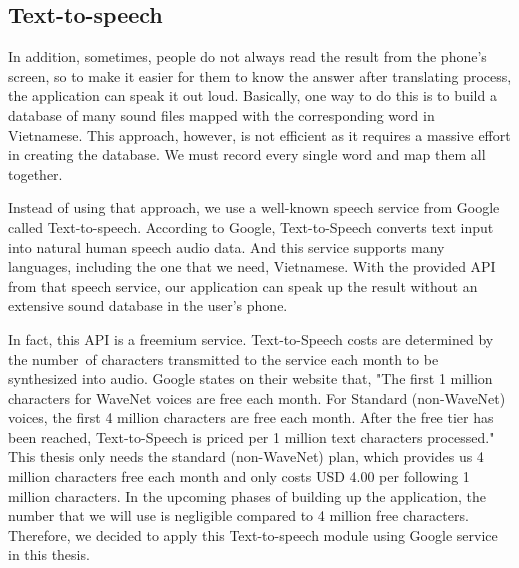 \subsection{Text-to-speech}

In addition, sometimes, people do not always read the result from the phone's screen, so to make it easier for them to know the answer after translating process, the application can speak it out loud. Basically, one way to do this is to build a database of many sound files mapped with the corresponding word in Vietnamese. This approach, however, is not efficient as it requires a massive effort in creating the database. We must record every single word and map them all together.

Instead of using that approach, we use a well-known speech service from Google called Text-to-speech. According to Google, Text-to-Speech converts text input into natural human speech audio data. And this service supports many languages, including the one that we need, Vietnamese. With the provided API from that speech service, our application can speak up the result without an extensive sound database in the user's phone.

In fact, this API is a freemium service. Text-to-Speech costs are determined by the number of characters transmitted to the service each month to be synthesized into audio. Google states on their website that,  "The first 1 million characters for WaveNet voices are free each month. For Standard (non-WaveNet) voices, the first 4 million characters are free each month. After the free tier has been reached, Text-to-Speech is priced per 1 million text characters processed." This thesis only needs the standard (non-WaveNet) plan, which provides us 4 million characters free each month and only costs USD 4.00 per following 1 million characters. In the upcoming phases of building up the application, the number that we will use is negligible compared to 4 million free characters. Therefore, we decided to apply this Text-to-speech module using Google service in this thesis.